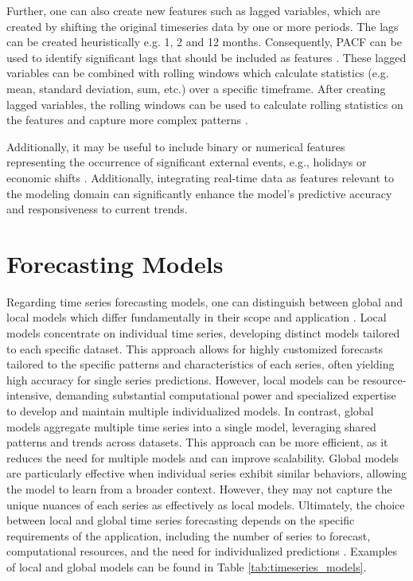 Further, one can also create new features such as lagged variables, which are created
by shifting the original timeseries data by one or more periods. The lags can be created
heuristically e.g. 1, 2 and 12 months. Consequently, \ac{PACF} can be used to identify
significant lags that should be included as features \parencite[ch. 6]{hyndman2018forecasting}.
These lagged variables can be combined with rolling windows which calculate statistics
(e.g. mean, standard deviation, sum, etc.) over a specific timeframe. After creating
lagged variables, the rolling windows can be used to calculate rolling statistics on
the features and capture more complex patterns \parencite[ch. 6]{hyndman2018forecasting}.

Additionally, it may be useful to include binary or numerical features representing
the occurrence of significant external events, e.g., holidays or economic shifts
\parencite[ch. 3]{hyndman2018forecasting}. Additionally, integrating real-time data as
features relevant to the modeling domain can significantly enhance the model's predictive
accuracy and responsiveness to current trends.

\section{Forecasting Models}
\label{sec:forecasting_models}
Regarding time series forecasting models, one can distinguish between global and local
models which differ fundamentally in their scope and application \parencite{montero2021principles}.
Local models concentrate on individual time series, developing distinct models
tailored to each specific dataset. This
approach allows for highly customized forecasts tailored to the specific patterns and
characteristics of each series, often yielding high accuracy for single series predictions.
However, local models can be resource-intensive, demanding substantial computational power and
specialized expertise to develop and maintain multiple individualized models. In contrast,
global models aggregate
multiple time series into a single model, leveraging shared patterns and trends across datasets.
This approach can be more efficient, as it reduces the need for multiple models and can
improve scalability. Global models are particularly effective when individual series
exhibit similar behaviors, allowing the model to learn from a broader context. However,
they may not capture the unique nuances of each series as effectively as local models.
Ultimately, the choice between local and global time series forecasting depends on the
specific requirements of the application, including the number of series to forecast,
computational resources, and the need for individualized predictions
\parencite{montero2021principles}. Examples of local and global models can be found in
Table \ref{tab:timeseries_models}.


